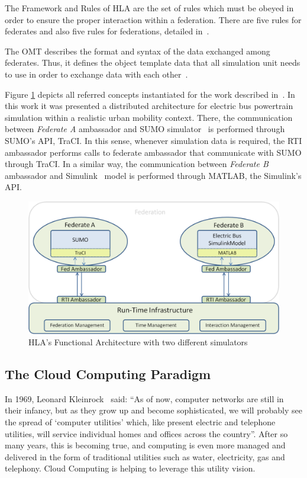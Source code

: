 \documentclass[conference]{IEEEtran}
\begin{document}
The Framework and Rules of HLA are the set of rules which must be obeyed in order to ensure the proper interaction within a federation. There are five rules for federates and also five rules for federations, detailed in~\cite{ieee2010hlaRUules}.

The OMT describes the format and syntax of the data exchanged among federates. Thus, it defines the object template data that all simulation unit needs to use in order to exchange data with each other~\cite{ieee2010hlaOMT}.

Figure \ref{fig:hla_macedo} depicts all referred concepts instantiated for the work described in~\cite{macedo2013intelligent}. In this work it was presented a distributed architecture for electric bus powertrain simulation within a realistic urban mobility context. There, the communication between \textit{Federate A} ambassador and SUMO simulator~\cite{behrisch2011sumo} is performed through SUMO's API, TraCI. In this sense, whenever simulation data is required, the RTI ambassador performs calls to federate ambassador that communicate with SUMO through TraCI.
In a similar way, the communication between \textit{Federate B} ambassador and Simulink~\cite{perrotta2012potential} model is performed through MATLAB, the Simulink's API.

\begin{figure}[!ht]
\centering
\includegraphics[width=.9\linewidth]{hla_macedo.png}
\caption{ HLA's Functional Architecture with two different simulators \cite{macedo2013integrated}}
\label{fig:hla_macedo}
\vspace{-0.9em}
\end{figure}

\subsection{The Cloud Computing Paradigm}
In 1969, Leonard Kleinrock~\cite{kleinrock2005vision} said: ``As of now, computer networks are still in their infancy, but as they grow up and become sophisticated, we will probably see the spread of `computer utilities' which, like present electric and telephone utilities, will service individual homes and offices across the country''. After so many years, this is becoming true, and computing is even more managed and delivered in the form of traditional utilities such as water, electricity, gas and telephony. Cloud Computing is helping to leverage this utility vision.  
\end{document}

